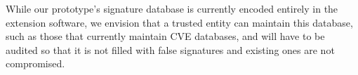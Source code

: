 While our prototype's signature database is currently encoded entirely in the extension software, we envision that a trusted entity can maintain this database, such as those that currently maintain CVE databases, and will have to be audited so that it is not filled with false signatures and existing ones are not compromised.